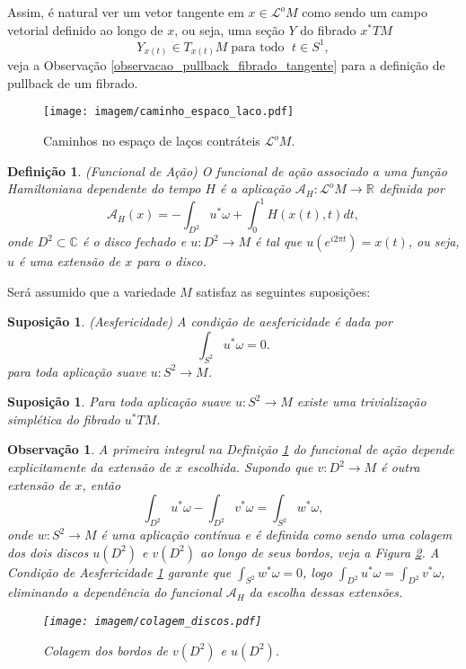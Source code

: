 \documentclass[12pt]{book}
\newtheorem{definicao}[teorema]{Definição}
\newtheorem{suposicao}[teorema]{Suposição}
\newtheorem{observacao}[teorema]{Observação}
\newcommand{\circulo}{S^{1}}
\newcommand{\espacotangenteponto}[2]{T_{#1}#2}
\newcommand{\funcionalH}{\mathcal{A}_{H}}
\newcommand{\funcionalHponto}[1]{\mathcal{A}_{H}(#1)}
\newcommand{\pullbackfibradotangente}[2]{#1^{*}T#2}
\newcommand{\pullbackfibradotangenteM}[1]{\pullbackfibradotangente{#1}{M}}
\newcommand{\real}[1]{\mathbb{R}^{#1}}
\newcommand{\reta}{\real{}}
\newcommand{\lacocontrateis}{\mathcal{L}^{o}M}
\begin{document}
	Assim, é natural ver um vetor tangente em $x\in \lacocontrateis$ como sendo um campo vetorial definido ao longo de $x$, ou seja, uma seção $Y$ do fibrado $\pullbackfibradotangenteM{x}$
	$$
	Y_{x(t)}\in \espacotangenteponto{x(t)}{M} \;\text{para todo  }\; t\in \circulo,
	$$
	veja a Observação \ref{observacao_pullback_fibrado_tangente} para a definição de pullback de um fibrado. 
	
	\begin{figure}[!h]
		\centering
		\texttt{[image: imagem/caminho\_espaco\_laco.pdf]}
		\caption{Caminhos no espaço de laços contráteis $\lacocontrateis$.}
		\label{figura_caminho_espaco_laco_contrateis}
	\end{figure} 
	
	\begin{definicao}\label{definicao_funcional_hamiltoniano}
		(Funcional de Ação) O funcional de ação associado a uma função Hamiltoniana dependente do tempo $H$ é a aplicação $\funcionalH: \lacocontrateis\to \reta$ definida por
		$$
		\funcionalHponto{x} = -\int_{D^{2}}u^{*}\omega + \int_{0}^{1}H(x(t), t)dt,
		$$
		onde $D^{2} \subset \mathbb{C}$ é o disco fechado e $u:D^{2}\to M$ é tal que $u(e^{i2\pi t})=x(t)$, ou seja, $u$ é uma extensão de $x$ para o disco.
	\end{definicao}
	
	Será assumido que a variedade $M$ satisfaz as seguintes suposições:
	
	\begin{suposicao}\label{suposicao_aesfericidade}
		(Aesfericidade) A condição de aesfericidade é dada por
		$$
			\int_{S^{2}} u^{*}\omega = 0.
		$$
		para toda aplicação suave $u:S^{2} \to M$. 
	\end{suposicao}
	
	\begin{suposicao}\label{suposicao_trivializacao}
		Para toda aplicação suave $u:S^{2}\to M$ existe uma trivialização simplética do fibrado $\pullbackfibradotangenteM{u}$.
	\end{suposicao}
	
	\begin{observacao}
		A primeira integral na Definição \ref{definicao_funcional_hamiltoniano} do funcional de ação depende explicitamente da extensão de $x$ escolhida. Supondo que $v : D^{2}\to M$ é outra extensão de $x$, então
		$$
		\int_{D^{2}}u^{*}\omega - \int_{D^{2}}v^{*}\omega  = \int_{S^{2}}w^{*}\omega, 
		$$
		onde $w:S^{2} \to M$ é uma aplicação contínua e é definida como sendo uma colagem dos dois discos $u(D^{2})$ e $v(D^{2})$ ao longo de seus bordos, veja a Figura \ref{figura_colagem_discos}. A Condição de Aesfericidade \ref{suposicao_aesfericidade} garante que $\int_{S^{2}}w^{*}\omega=0$, logo $\int_{D^{2}}u^{*}\omega = \int_{D^{2}}v^{*}\omega$, eliminando a dependência do funcional $\funcionalH$ da escolha dessas extensões.
		
		\begin{figure}[!h]
			\centering
			\texttt{[image: imagem/colagem\_discos.pdf]}
			\caption{Colagem dos bordos de $v(D^{2})$ e $u(D^{2})$.}
			\label{figura_colagem_discos}
		\end{figure}
	\end{observacao}
	
\end{document}
